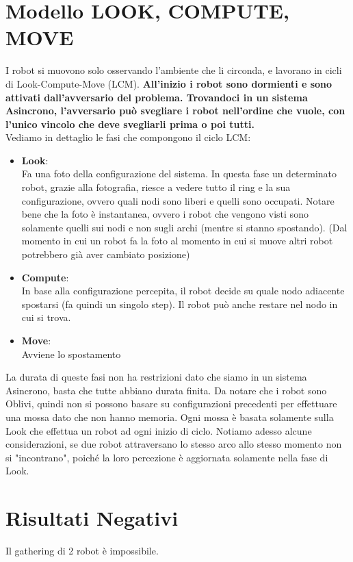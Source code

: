\section{Modello LOOK, COMPUTE, MOVE}
I robot si muovono solo osservando l'ambiente che li circonda, e lavorano in
cicli di Look-Compute-Move (LCM). \textbf{All'inizio i robot sono dormienti e
    sono attivati dall'avversario del problema. Trovandoci in un sistema Asincrono,
    l'avversario può svegliare i robot nell'ordine che vuole, con l'unico vincolo
    che deve svegliarli prima o poi tutti.}\\
Vediamo in dettaglio le fasi che compongono il ciclo LCM:
\begin{itemize}
    \item \textbf{Look}:\\
          Fa una foto della configurazione del sistema. In questa fase un
          determinato robot, grazie alla fotografia, riesce a vedere tutto il ring
          e la sua configurazione, ovvero quali nodi sono liberi e quelli sono
          occupati. Notare bene che la foto è instantanea, ovvero i robot che
          vengono visti sono solamente quelli sui nodi e non sugli archi (mentre
          si stanno spostando). (Dal momento in cui un robot fa la foto al momento
          in cui si muove altri robot potrebbero già aver cambiato posizione)

    \item \textbf{Compute}:\\
          In base alla configurazione percepita, il robot decide su quale nodo
          adiacente spostarsi (fa quindi un singolo step). Il robot può anche
          restare nel nodo in cui si trova.

    \item \textbf{Move}: \\
          Avviene lo spostamento
\end{itemize}
La durata di queste fasi non ha restrizioni dato che siamo in un sistema
Asincrono, basta che tutte abbiano durata finita. Da notare che i robot sono
Oblivi, quindi non si possono basare su configurazioni precedenti per effettuare
una mossa dato che non hanno memoria. Ogni mossa è basata solamente sulla Look
che effettua un robot ad ogni inizio di ciclo. Notiamo adesso alcune
considerazioni, se due robot attraversano lo stesso arco allo stesso momento non
si "incontrano", poiché la loro percezione è aggiornata solamente nella fase di
Look.\\

\section{Risultati Negativi}
\begin{theorem}
    Il gathering di 2 robot è impossibile.
\end{theorem}

